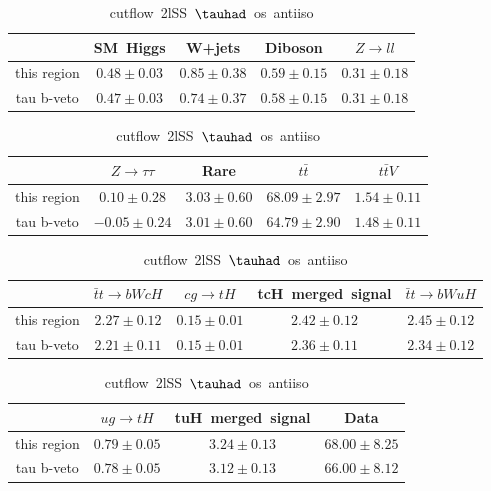 \begin{table}
\caption{cutflow~2lSS~$\tauhad$~os~antiiso}
\centering
\begin{tabular}{|c|c|c|c|c|} \hline
 & SM~Higgs & W+jets & Diboson & $Z\to ll$\\\hline
this region & $0.48\pm0.03$ & $0.85\pm0.38$ & $0.59\pm0.15$ & $0.31\pm0.18$\\\hline
tau b-veto & $0.47\pm0.03$ & $0.74\pm0.37$ & $0.58\pm0.15$ & $0.31\pm0.18$\\\hline
\end{tabular}
\begin{tabular}{|c|c|c|c|c|} \hline
 & $Z\to \tau\tau$ & Rare & $t\bar{t}$ & $t\bar{t}V$\\\hline
this region & $0.10\pm0.28$ & $3.03\pm0.60$ & $68.09\pm2.97$ & $1.54\pm0.11$\\\hline
tau b-veto & $-0.05\pm0.24$ & $3.01\pm0.60$ & $64.79\pm2.90$ & $1.48\pm0.11$\\\hline
\end{tabular}
\begin{tabular}{|c|c|c|c|c|} \hline
 & $\bar{t}t\to bWcH$ & $cg\to tH$ & tcH~merged~signal & $\bar{t}t\to bWuH$\\\hline
this region & $2.27\pm0.12$ & $0.15\pm0.01$ & $2.42\pm0.12$ & $2.45\pm0.12$\\\hline
tau b-veto & $2.21\pm0.11$ & $0.15\pm0.01$ & $2.36\pm0.11$ & $2.34\pm0.12$\\\hline
\end{tabular}
\begin{tabular}{|c|c|c|c|} \hline
 & $ug\to tH$ & tuH~merged~signal & Data\\\hline
this region & $0.79\pm0.05$ & $3.24\pm0.13$ & $68.00\pm8.25$\\\hline
tau b-veto & $0.78\pm0.05$ & $3.12\pm0.13$ & $66.00\pm8.12$\\\hline
\end{tabular}
\label{tab:cutflow_reg2lSS1tau1bnj_os_antiiso}
\end{table}

